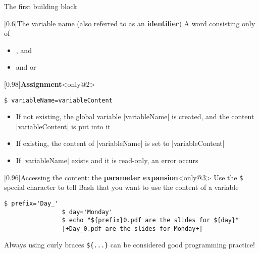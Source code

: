 \begin{frame}[fragile]{The first building block}
\begin{overlayarea}{\textwidth}{0.3\textheight}
\begin{varblock*}{}[0.6\textwidth]{The variable name (also referred to as an \textbf{identifier})}
            A word consisting only of
            \begin{itemize}
                \item {},  and 
                \item and  or 
            \end{itemize}
        \end{varblock*}
        \begin{varblock*}{}[0.98\textwidth]{\textbf{Assignment}}<only@2>
            \begin{lstlisting}[style=MyBash, numbers=none, xrightmargin=26mm, xleftmargin=26mm]
                $ variableName=variableContent
            \end{lstlisting}
            \begin{itemize}
                \item If not existing, the \alert{global} variable \bash|variableName| is created, and the content \bash|variableContent| is put into it
                \item If existing, the content of \bash|variableName| is set to \bash|variableContent|
                \item If \bash|variableName| exists and it is read-only, an error occurs
            \end{itemize}
        \end{varblock*}
        \begin{varblock}{}[0.96\textwidth]{Accessing the content: the \textbf{parameter expansion}}<only@3>
            Use the \texttt{\$} special character to tell Bash that you want to use the content of a variable
            \begin{lstlisting}[style=MyBash, numbers=none, belowskip=-5mm]
                $ prefix='Day_'
                $ day='Monday'
                $ echo "${prefix}0.pdf are the slides for ${day}"
                |+Day_0.pdf are the slides for Monday+|
            \end{lstlisting}
            \alert{Always} using curly braces \alert{\texttt{\$\{...\}}} can be considered \alert{good programming practice}!
        \end{varblock}
    \end{overlayarea}
\end{frame}
